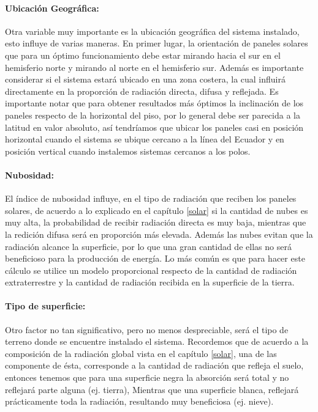 \paragraph{Ubicación Geográfica:}
Otra variable muy importante es la ubicación geográfica del sistema instalado, esto influye de varias maneras. En primer lugar, la orientación de paneles solares que para un óptimo funcionamiento debe estar mirando hacia el sur en el hemisferio norte y mirando al norte en el hemisferio sur. Además es importante considerar si el sistema estará ubicado en una zona costera, la cual influirá directamente en la proporción de radiación directa, difusa y reflejada. Es importante notar que para obtener resultados más óptimos la inclinación de los paneles respecto de la horizontal del piso, por lo general debe ser parecida a la latitud en valor absoluto, así tendríamos que ubicar los paneles casi en posición horizontal cuando el sistema se ubique cercano a la línea del Ecuador y en posición vertical cuando instalemos sistemas cercanos a los polos.

\paragraph{Nubosidad:}
El índice de nubosidad influye, en el tipo de radiación que reciben los paneles solares, de acuerdo a lo explicado en el capítulo \ref{solar} si la cantidad de nubes es muy alta, la probabilidad de recibir radiación directa es muy baja, mientras que la redición difusa será en proporción más elevada. Además las nubes evitan que la radiación alcance la superficie, por lo que una gran cantidad de ellas no será beneficioso para la producción de energía. Lo más común es que para hacer este cálculo se utilice un modelo proporcional respecto de la cantidad de radiación extraterrestre y la cantidad de radiación recibida en la superficie de la tierra.

\paragraph{Tipo de superficie:}
Otro factor no tan significativo, pero no menos despreciable, será el tipo de terreno donde se encuentre instalado el sistema. Recordemos que de acuerdo a la composición de la radiación global vista en el capítulo \ref{solar}, una de las componente de ésta, corresponde a la cantidad de radiación que refleja el suelo, entonces tenemos que para una superficie negra la absorción será total y no reflejará parte alguna (ej. tierra), Mientras que una superficie blanca, reflejará prácticamente toda la radiación, resultando muy beneficiosa (ej. nieve).\\

